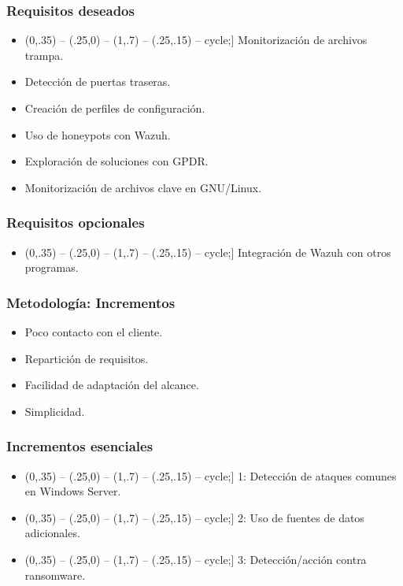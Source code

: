 \documentclass[a4paper,10pt]{beamer}
\def\checkmark{\tikz\fill[scale=0.4,color=black!30!green](0,.35) -- (.25,0) -- (1,.7) -- (.25,.15) -- cycle;}
\def\crossmark{\textcolor{black!10!red}{X\ }}
\begin{document}
\begin{frame}[fragile]
	\frametitle{Requisitos deseados}

	\begin{itemize}
		\item[\checkmark] Monitorización de archivos trampa.
		\item[\crossmark] Detección de puertas traseras.
		\item[\crossmark] Creación de perfiles de configuración.
		\item[\crossmark] Uso de honeypots con Wazuh.
		\item[\crossmark] Exploración de soluciones con GPDR.
		\item[\crossmark] Monitorización de archivos clave en GNU/Linux.
	\end{itemize}
\end{frame}

\begin{frame}[fragile]
	\frametitle{Requisitos opcionales}

	\begin{itemize}
		\item[\checkmark] Integración de Wazuh con otros programas. %
	\end{itemize}
\end{frame}

\begin{frame}[fragile]
	\frametitle{Metodología: Incrementos}

	\begin{itemize}
		\item Poco contacto con el cliente.
		\item Repartición de requisitos.
		\item Facilidad de adaptación del alcance.
		\item Simplicidad.
	\end{itemize}
\end{frame}

\begin{frame}[fragile]
	\frametitle{Incrementos esenciales}

	\begin{itemize}
		\item[\checkmark] 1: Detección de ataques comunes en Windows Server.
		\item[\checkmark] 2: Uso de fuentes de datos adicionales.
		\item[\checkmark] 3: Detección/acción contra ransomware.
	\end{itemize}
\end{frame}
\end{document}
